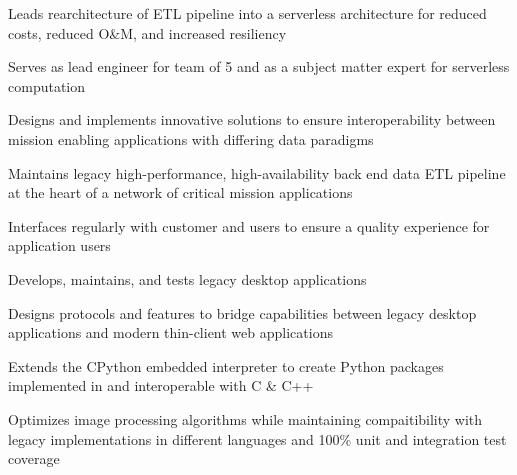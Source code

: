 \documentclass[]{resume}
\begin{document}
\begin{minipage}[t]{0.74\textwidth}
\sectionsep

\begin{tightemize}
\item Leads rearchitecture of ETL pipeline into a serverless architecture for reduced costs, reduced O\&M, and increased resiliency
\item Serves as lead engineer for team of 5 and as a subject matter expert for serverless computation
\item Designs and implements innovative solutions to ensure interoperability between mission enabling applications with differing data paradigms
\item Maintains legacy high-performance, high-availability back end data ETL pipeline at the heart of a network of critical mission applications
\item Interfaces regularly with customer and users to ensure a quality experience for application users
\end{tightemize}

\sectionsep

\begin{tightemize}
\item Develops, maintains, and tests legacy desktop applications
\item Designs protocols and features to bridge capabilities between legacy desktop applications and modern thin-client web applications
\item Extends the CPython embedded interpreter to create Python packages implemented in and interoperable with C \& C++
\item Optimizes image processing algorithms while maintaining compaitibility with legacy implementations in different languages and 100\% unit and integration test coverage
\end{tightemize}

\sectionsep


\end{minipage}
\end{document}

